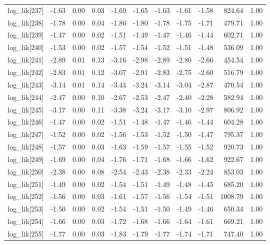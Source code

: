 \begin{table}[ht]
\begin{tabular}{rrrrrrrrrrr}
  log\_lik[237] & -1.63 & 0.00 & 0.03 & -1.69 & -1.65 & -1.63 & -1.61 & -1.58 & 824.64 & 1.00 \\ 
  log\_lik[238] & -1.78 & 0.00 & 0.04 & -1.86 & -1.80 & -1.78 & -1.75 & -1.71 & 479.71 & 1.00 \\ 
  log\_lik[239] & -1.47 & 0.00 & 0.02 & -1.51 & -1.49 & -1.47 & -1.46 & -1.44 & 602.71 & 1.00 \\ 
  log\_lik[240] & -1.53 & 0.00 & 0.02 & -1.57 & -1.54 & -1.52 & -1.51 & -1.48 & 536.09 & 1.00 \\ 
  log\_lik[241] & -2.89 & 0.01 & 0.13 & -3.16 & -2.98 & -2.89 & -2.80 & -2.66 & 454.54 & 1.00 \\ 
  log\_lik[242] & -2.83 & 0.01 & 0.12 & -3.07 & -2.91 & -2.83 & -2.75 & -2.60 & 516.79 & 1.00 \\ 
  log\_lik[243] & -3.14 & 0.01 & 0.14 & -3.44 & -3.24 & -3.14 & -3.04 & -2.87 & 470.54 & 1.00 \\ 
  log\_lik[244] & -2.47 & 0.00 & 0.10 & -2.67 & -2.53 & -2.47 & -2.40 & -2.28 & 582.94 & 1.00 \\ 
  log\_lik[245] & -3.17 & 0.00 & 0.11 & -3.38 & -3.24 & -3.17 & -3.10 & -2.97 & 806.92 & 1.00 \\ 
  log\_lik[246] & -1.47 & 0.00 & 0.02 & -1.51 & -1.48 & -1.47 & -1.46 & -1.44 & 604.28 & 1.00 \\ 
  log\_lik[247] & -1.52 & 0.00 & 0.02 & -1.56 & -1.53 & -1.52 & -1.50 & -1.47 & 795.37 & 1.00 \\ 
  log\_lik[248] & -1.57 & 0.00 & 0.03 & -1.63 & -1.59 & -1.57 & -1.55 & -1.52 & 920.73 & 1.00 \\ 
  log\_lik[249] & -1.69 & 0.00 & 0.04 & -1.76 & -1.71 & -1.68 & -1.66 & -1.62 & 922.67 & 1.00 \\ 
  log\_lik[250] & -2.38 & 0.00 & 0.08 & -2.54 & -2.43 & -2.38 & -2.33 & -2.24 & 853.03 & 1.00 \\ 
  log\_lik[251] & -1.49 & 0.00 & 0.02 & -1.54 & -1.51 & -1.49 & -1.48 & -1.45 & 685.20 & 1.00 \\ 
  log\_lik[252] & -1.56 & 0.00 & 0.03 & -1.61 & -1.57 & -1.56 & -1.54 & -1.51 & 1008.79 & 1.00 \\ 
  log\_lik[253] & -1.50 & 0.00 & 0.02 & -1.54 & -1.51 & -1.50 & -1.49 & -1.46 & 650.34 & 1.00 \\ 
  log\_lik[254] & -1.66 & 0.00 & 0.03 & -1.72 & -1.68 & -1.66 & -1.64 & -1.61 & 669.21 & 1.00 \\ 
  log\_lik[255] & -1.77 & 0.00 & 0.03 & -1.83 & -1.79 & -1.77 & -1.74 & -1.71 & 747.40 & 1.00 \\ 

\end{tabular}
\end{table}
